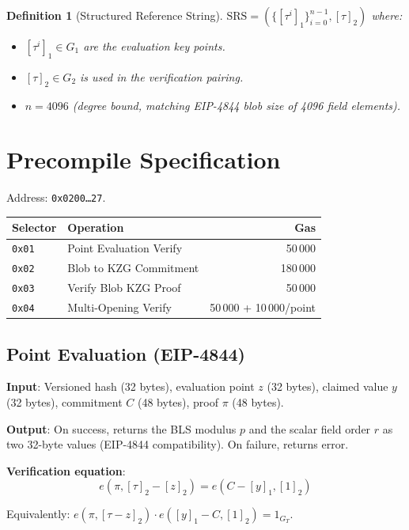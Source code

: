\documentclass[11pt,a4paper]{article}
\newtheorem{definition}{Definition}
\begin{document}
\begin{definition}[Structured Reference String]
$\text{SRS} = (\{[\tau^i]_1\}_{i=0}^{n-1}, [\tau]_2)$ where:
\begin{itemize}
  \item $[\tau^i]_1 \in G_1$ are the evaluation key points.
  \item $[\tau]_2 \in G_2$ is used in the verification pairing.
  \item $n = 4096$ (degree bound, matching EIP-4844 blob size of 4096 field elements).
\end{itemize}
\end{definition}

\section{Precompile Specification}

Address: \texttt{0x0200\ldots27}.

\begin{table}[H]
\centering
\begin{tabular}{llr}
\toprule
\textbf{Selector} & \textbf{Operation} & \textbf{Gas} \\
\midrule
\texttt{0x01} & Point Evaluation Verify & 50\,000 \\
\texttt{0x02} & Blob to KZG Commitment & 180\,000 \\
\texttt{0x03} & Verify Blob KZG Proof & 50\,000 \\
\texttt{0x04} & Multi-Opening Verify & 50\,000 + 10\,000/point \\
\bottomrule
\end{tabular}
\end{table}

\subsection{Point Evaluation (EIP-4844)}

\textbf{Input}: Versioned hash (32 bytes), evaluation point $z$ (32 bytes),
claimed value $y$ (32 bytes), commitment $C$ (48 bytes), proof $\pi$ (48 bytes).

\textbf{Output}: On success, returns the BLS modulus $p$ and the scalar field order $r$
as two 32-byte values (EIP-4844 compatibility). On failure, returns error.

\textbf{Verification equation}:
\[
  e(\pi, [\tau]_2 - [z]_2) = e(C - [y]_1, [1]_2)
\]

Equivalently: $e(\pi, [\tau - z]_2) \cdot e([y]_1 - C, [1]_2) = 1_{G_T}$.
\end{document}
